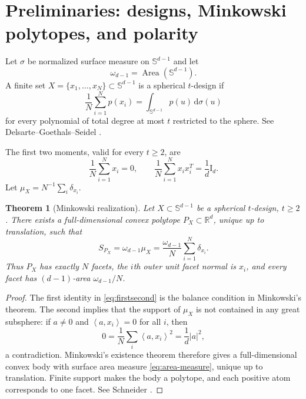 \documentclass[11pt]{amsart}
\newtheorem{theorem}{Theorem}[section]
\theoremstyle{definition}
\theoremstyle{remark}
\newcommand{\R}{\mathbb R}
\newcommand{\Sph}{\mathbb S}
\newcommand{\Id}{\mathrm I}
\newcommand{\dd}{\,\mathrm d}
\newcommand{\ip}[2]{\left\langle #1,#2\right\rangle}
\newcommand{\Area}{\operatorname{Area}}
\begin{document}
\section{Preliminaries: designs, Minkowski polytopes, and polarity}
\label{sec:prelim}

Let $\sigma$ be normalized surface measure on $\Sph^{d-1}$ and let
\[
 \omega_{d-1}=\Area(\Sph^{d-1}).
\]
A finite set $X=\{x_1,\ldots,x_N\}\subset\Sph^{d-1}$ is a spherical $t$-design if
\begin{equation}\label{eq:design}
 \frac1N\sum_{i=1}^Np(x_i)
 =\int_{\Sph^{d-1}}p(u)\dd\sigma(u)
\end{equation}
for every polynomial of total degree at most $t$ restricted to the sphere.  See Delsarte--Goethals--Seidel \cite{DGS1977}.

The first two moments, valid for every $t\ge2$, are
\begin{equation}\label{eq:firstsecond}
 \frac1N\sum_{i=1}^Nx_i=0,
 \qquad
 \frac1N\sum_{i=1}^Nx_ix_i^T=\frac1d\Id_d.
\end{equation}
Let $\mu_X=N^{-1}\sum_i\delta_{x_i}$.

\begin{theorem}[Minkowski realization]\label{thm:minkowski}
Let $X\subset\Sph^{d-1}$ be a spherical $t$-design, $t\ge2$.  There exists a full-dimensional convex polytope $P_X\subset\R^d$, unique up to translation, such that
\begin{equation}\label{eq:area-measure}
 S_{P_X}=\omega_{d-1}\mu_X
 =\frac{\omega_{d-1}}{N}\sum_{i=1}^N\delta_{x_i}.
\end{equation}
Thus $P_X$ has exactly $N$ facets, the $i$th outer unit facet normal is $x_i$, and every facet has $(d-1)$-area $\omega_{d-1}/N$.
\end{theorem}

\begin{proof}
The first identity in \eqref{eq:firstsecond} is the balance condition in Minkowski's theorem.  The second implies that the support of $\mu_X$ is not contained in any great subsphere: if $a\ne0$ and $\ip{a}{x_i}=0$ for all $i$, then
\[
 0=\frac1N\sum_i\ip{a}{x_i}^2=\frac1d|a|^2,
\]
a contradiction.  Minkowski's existence theorem therefore gives a full-dimensional convex body with surface area measure \eqref{eq:area-measure}, unique up to translation.  Finite support makes the body a polytope, and each positive atom corresponds to one facet.  See Schneider \cite{Schneider2014}.  \qedhere
\end{proof}
\end{document}
